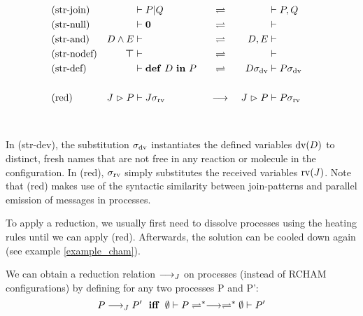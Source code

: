 \begin{align*}
  \rchamequ{str-join}{
    \rchamcnf*{}{P \jpar Q}
  }{
    \rchamcnf*{}{P, Q}
  }
  \\
  \rchamequ{str-null}{
    \rchamcnf*{}{\jnullproc}
  }{
    \rchamcnf*{}{}
  }
  \\
  \rchamequ{str-and}{
    \rchamcnf*{D \jcon E}{}
  }{
    \rchamcnf*{D, E}{}
  }
  \\
  \rchamequ{str-nodef}{
    \rchamcnf*{\jnulldef}{}
  }{
    \rchamcnf*{}{}
  }
  \\
  \rchamequ{str-def}{
    \rchamcnf*{}{\jdef{D}{P}}
  }{
    \rchamcnf*{D\sigma_{\opdv}}{P\sigma_{\opdv}}
  }
  \\
  \\
  \rchamred{red}{
    \rchamcnf*{\jrct{J}{P}}{J\sigma_{\oprv}}
  }{
    \rchamcnf*{\jrct{J}{P}}{P\sigma_{\oprv}}
  }
\end{align*}
\\
\\
In (str-dev), the substitution $\sigma_{\operatorname{dv}}$ instantiates the defined
variables $\operatorname{dv}(D)$ to distinct, fresh names that are not free in any reaction
or molecule in the configuration.
In (red), $\sigma_{\operatorname{rv}}$ simply substitutes the received variables $\operatorname{rv}(J)$.
Note that (red) makes use of the syntactic similarity between join-patterns
and parallel emission of messages in processes.

To apply a reduction, we usually first need to dissolve processes
using the heating rules until we can apply (red).
Afterwards, the solution can be cooled down again
(see example \ref{example_cham}).

We can obtain a reduction relation $\longrightarrow_J$
on processes (instead of RCHAM configurations)
by defining for any two processes P and P':
\begin{equation*}
  P \joinreduction P'
  \ \ \textbf{iff} \ \ 
  \rchamcnf{\emptyset}{P}
  \rchamheating^*\rchamreduction\rchamheating^*
  \rchamcnf{\emptyset}{P'}
\end{equation*}
\\

